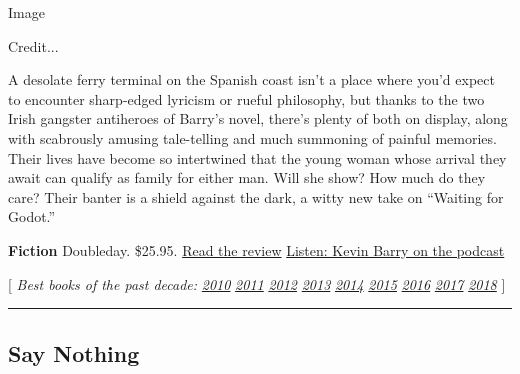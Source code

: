 Image

Credit...

A desolate ferry terminal on the Spanish coast isn't a place where you'd
expect to encounter sharp-edged lyricism or rueful philosophy, but
thanks to the two Irish gangster antiheroes of Barry's novel, there's
plenty of both on display, along with scabrously amusing tale-telling
and much summoning of painful memories. Their lives have become so
intertwined that the young woman whose arrival they await can qualify as
family for either man. Will she show? How much do they care? Their
banter is a shield against the dark, a witty new take on ``Waiting for
Godot.''

\textbf{Fiction} \textbar{} Doubleday. \$25.95. \textbar{}
\href{https://www.nytimes3xbfgragh.onion/2019/09/19/books/review/night-boat-to-tangier-kevin-barry.html}{Read
the review} \textbar{}
\href{https://www.nytimes3xbfgragh.onion/2019/09/27/books/review/podcast-samantha-power-education-idealist-craig-johnson-longmire.html}{Listen:
Kevin Barry on the podcast}

{[} \emph{Best books of the past decade:}
\href{https://www.nytimes3xbfgragh.onion/2010/12/12/books/review/10-best-books-of-2010.html}{\emph{2010}}
\emph{\textbar{}}
\href{https://www.nytimes3xbfgragh.onion/2011/12/11/books/10-best-books-of-2011.html}{\emph{2011}}
\emph{\textbar{}}
\href{https://www.nytimes3xbfgragh.onion/2012/12/09/books/review/10-best-books-of-2012.html}{\emph{2012}}
\emph{\textbar{}}
\href{https://www.nytimes3xbfgragh.onion/2013/12/15/books/review/the-10-best-books-of-2013.html}{\emph{2013}}
\emph{\textbar{}}
\href{https://www.nytimes3xbfgragh.onion/2014/12/14/books/review/the-10-best-books-of-2014.html}{\emph{2014}}
\emph{\textbar{}}
\href{https://www.nytimes3xbfgragh.onion/interactive/2015/12/02/books/review/best-books-of-2015.html}{\emph{2015}}
\emph{\textbar{}}
\href{https://www.nytimes3xbfgragh.onion/interactive/2016/books/review/best-books.html?searchResultPosition=14}{\emph{2016}}
\emph{\textbar{}}
\href{https://www.nytimes3xbfgragh.onion/interactive/2017/books/review/10-best-books-2017.html}{\emph{2017}}
\emph{\textbar{}}
\href{https://www.nytimes3xbfgragh.onion/2018/11/29/books/review/best-books.html}{\emph{2018}}
{]}

\begin{center}\rule{0.5\linewidth}{\linethickness}\end{center}

\hypertarget{say-nothing}{%
\subsection{Say Nothing}\label{say-nothing}}

